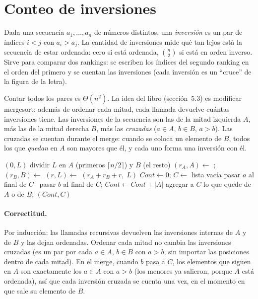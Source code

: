 \section{Conteo de inversiones}

Dada una secuencia $a_1,\dots,a_n$ de números distintos, una \emph{inversión} es un par de índices $i<j$ con $a_i>a_j$. La cantidad de inversiones mide qué tan lejos está la secuencia de estar ordenada: cero si está ordenada, $\binom n2$ si está en orden inverso. Sirve para comparar dos rankings: se escriben los índices del segundo ranking en el orden del primero y se cuentan las inversiones (cada inversión es un ``cruce'' de la figura de la letra).

Contar todos los pares es $\Theta(n^2)$. La idea del libro (sección~5.3) es modificar mergesort: además de ordenar cada mitad, cada llamada devuelve cuántas inversiones tiene. Las inversiones de la secuencia son las de la mitad izquierda $A$, más las de la mitad derecha $B$, más las \emph{cruzadas} ($a\in A$, $b\in B$, $a>b$). Las cruzadas se cuentan durante el merge: cuando se coloca un elemento de $B$, todos los que \emph{quedan} en $A$ son mayores que él, y cada uno forma una inversión con él.

\begin{algorithmic}[1]
   \Return $(0,L)$ \EndIf
  \State dividir $L$ en $A$ (primeros $\lceil n/2\rceil$) y $B$ (el resto)
  \State $(r_A,A)\gets$ ;\; $(r_B,B)\gets$ 
  \State $(r,L)\gets$ 
  \State \Return $(r_A+r_B+r,\;L)$
\EndFunction
{} 
  \State $Cont\gets 0$;\; $C\gets$ lista vacía
   
     pasar $a$ al final de $C$
    \Else\ pasar $b$ al final de $C$;\; $Cont\gets Cont+|A|$ 
    \EndIf
  \EndWhile
  \State agregar a $C$ lo que quede de $A$ o de $B$;\; \Return $(Cont,C)$
\EndFunction
\end{algorithmic}

\paragraph{Correctitud.} Por inducción: las llamadas recursivas devuelven las inversiones internas de $A$ y de $B$ y las dejan ordenadas. Ordenar cada mitad no cambia las inversiones cruzadas (es un par por cada $a\in A$, $b\in B$ con $a>b$, sin importar las posiciones dentro de cada mitad). En el merge, cuando $b$ pasa a $C$, los elementos que siguen en $A$ son exactamente los $a\in A$ con $a>b$ (los menores ya salieron, porque $A$ está ordenada), así que cada inversión cruzada se cuenta una vez, en el momento en que sale su elemento de $B$.

